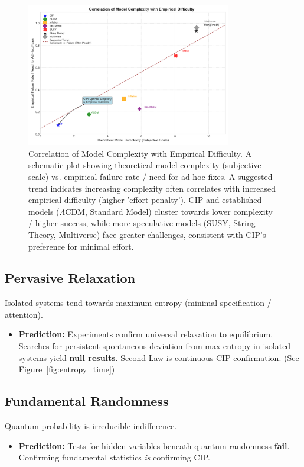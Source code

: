 \documentclass[11pt, a4paper]{article}
\begin{document}
\begin{figure}[H]
    \centering
    \includegraphics[width=0.8\textwidth]{CIP_ComplexityDifficulty.png}
    \caption[Correlation of Model Complexity with Empirical Difficulty]{Correlation of Model Complexity with Empirical Difficulty. A schematic plot showing theoretical model complexity (subjective scale) vs. empirical failure rate / need for ad-hoc fixes. A suggested trend indicates increasing complexity often correlates with increased empirical difficulty (higher 'effort penalty'). CIP and established models ($\Lambda$CDM, Standard Model) cluster towards lower complexity / higher success, while more speculative models (SUSY, String Theory, Multiverse) face greater challenges, consistent with CIP's preference for minimal effort.}
    \label{fig:complexity_difficulty}
\end{figure}

\subsection{Pervasive Relaxation}
Isolated systems tend towards maximum entropy (minimal specification / attention).
\begin{itemize}
    \item \textbf{Prediction:} Experiments confirm universal relaxation to equilibrium. Searches for persistent spontaneous deviation from max entropy in isolated systems yield \textbf{null results}. Second Law is continuous CIP confirmation. (See Figure~\ref{fig:entropy_time})
\end{itemize}

\subsection{Fundamental Randomness}
Quantum probability is irreducible indifference.
\begin{itemize}
    \item \textbf{Prediction:} Tests for hidden variables beneath quantum randomness \textbf{fail}. Confirming fundamental statistics \textit{is} confirming CIP.
\end{itemize}
\end{document}
